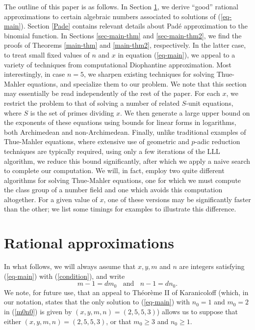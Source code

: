 The outline of this paper is as follows. In Section \ref{proof}, we derive ``good'' rational approximations to certain algebraic numbers associated to solutions of (\ref{eq-main}). Section \ref{Pade} contains relevant details about Pad\'e approximation to the binomial function. In Sections \ref{sec-main-thm} and \ref{sec-main-thm2}, we find the proofs of Theorems \ref{main-thm} and \ref{main-thm2}, respectively. In the latter case, to treat small fixed values of $n$ and $x$ in equation (\ref{eq-main}), we appeal to a variety of techniques from computational Diophantine approximation. Most interestingly, in case $n=5$, we sharpen existing techniques for solving  Thue-Mahler equations, and specialize them to our problem. We note that this section may essentially be read independently of the rest of the paper. For each $x$, we restrict the problem to that of solving a number of related $S$-unit equations, where $S$ is the set of primes dividing $x$. We then generate a large upper bound on the exponents of these equations using bounds for linear forms in logarithms, both Archimedean and non-Archimedean. Finally, unlike traditional examples of Thue-Mahler equations, where extensive use of geometric and $p$-adic reduction techniques are typically required, using only a few iterations of the LLL algorithm, we reduce this bound significantly, after which we apply a naive search to complete our computation. We will, in fact, employ  two quite different algorithms for solving Thue-Mahler equations, one for which we must compute the class group of a number field and one which avoids this computation altogether. For a given value of $x$, one of these versions may be significantly faster than the other; we list some timings for examples to illustrate this difference. 

\section{Rational approximations} \label{proof}

In what follows, we will always assume that $x, y, m$ and $n$ are integers satisfying (\ref{eq-main}) with (\ref{condition}), and write
\begin{equation} \label{m0n0}
 m-1 = d m_0 \; \; \mbox{ and } \; \; n-1 = d n_0.
 \end{equation}
 We note, for future use, that  an appeal to Th\'eor\`eme II of Karanicoloff \cite{Ka} (which, in our notation, states that the only solution to (\ref{eq-main}) with $n_0=1$ and $m_0=2$ in (\ref{m0n0}) is given by $(x,y,m,n) = (2,5,5,3)$) allows us to suppose that either $(x,y,m,n) = (2,5,5,3)$, or that  $m_0 \geq 3$ and $n_0 \geq 1$.

